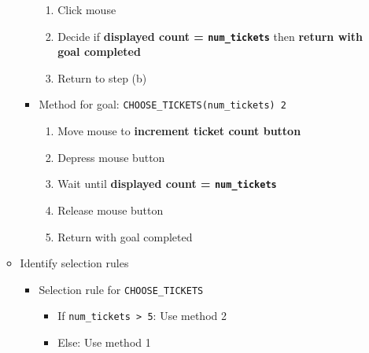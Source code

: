 \documentclass[11pt,a4paper]{report}
\begin{document}
\begin{enumerate}
\begin{itemize}
\begin{itemize}
\begin{enumerate}
                                \item Click mouse
                                \item Decide if \textbf{displayed count = \texttt{num\_tickets}} then \textbf{return with goal completed}
                                \item Return to step (b)
                            \end{enumerate}
                        \item Method for goal: \texttt{CHOOSE\_TICKETS(num\_tickets) 2}
                            \begin{enumerate}
                                \item Move mouse to \textbf{increment ticket count button}  
                                \item Depress mouse button
                                \item Wait until \textbf{displayed count = \texttt{num\_tickets}}
                                \item Release mouse button
                                \item Return with goal completed
                            \end{enumerate}
                    \end{itemize}
                \item Identify selection rules
                    \begin{itemize}
                        \item Selection rule for \texttt{CHOOSE\_TICKETS}
                            \begin{itemize}
                                \item If \texttt{num\_tickets > 5}: Use method 2
                                \item Else: Use method 1
                            \end{itemize}
                    \end{itemize}
        \end{itemize}


\end{enumerate}
\end{document}
